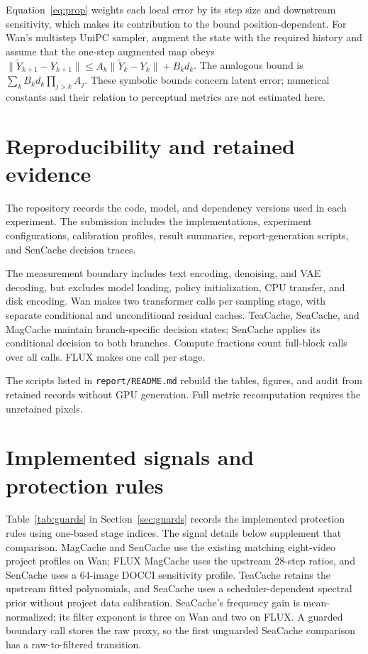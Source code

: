 \documentclass[10pt,twocolumn,letterpaper]{article}
\begin{document}
Equation~\ref{eq:prop} weights each local error by its step size and downstream sensitivity, which makes its contribution to the bound position-dependent.
For Wan's multistep UniPC sampler, augment the state with the required history and assume that the one-step augmented map obeys $\|\widetilde Y_{k+1}-Y_{k+1}\|\le A_k\|\widetilde Y_k-Y_k\|+B_kd_k$.
The analogous bound is $\sum_k B_kd_k\prod_{j>k}A_j$.
These symbolic bounds concern latent error; numerical constants and their relation to perceptual metrics are not estimated here.

\section{Reproducibility and retained evidence}
\label{app:reproducibility}
The repository records the code, model, and dependency versions used in each experiment.
The submission includes the implementations, experiment configurations, calibration profiles, result summaries, report-generation scripts, and SenCache decision traces.

The measurement boundary includes text encoding, denoising, and VAE decoding, but excludes model loading, policy initialization, CPU transfer, and disk encoding.
Wan makes two transformer calls per sampling stage, with separate conditional and unconditional residual caches.
TeaCache, SeaCache, and MagCache maintain branch-specific decision states; SenCache applies its conditional decision to both branches.
Compute fractions count full-block calls over all calls.
FLUX makes one call per stage.

The scripts listed in \texttt{report/README.md} rebuild the tables, figures, and audit from retained records without GPU generation.
Full metric recomputation requires the unretained pixels.

\section{Implemented signals and protection rules}
\label{app:rules}
Table~\ref{tab:guards} in Section~\ref{sec:guards} records the implemented protection rules using one-based stage indices.
The signal details below supplement that comparison.
MagCache and SenCache use the existing matching eight-video project profiles on Wan; FLUX MagCache uses the upstream 28-step ratios, and SenCache uses a 64-image DOCCI sensitivity profile.
TeaCache retains the upstream fitted polynomials, and SeaCache uses a scheduler-dependent spectral prior without project data calibration.
SeaCache's frequency gain is mean-normalized; its filter exponent is three on Wan and two on FLUX.
A guarded boundary call stores the raw proxy, so the first unguarded SeaCache comparison has a raw-to-filtered transition.
\end{document}
